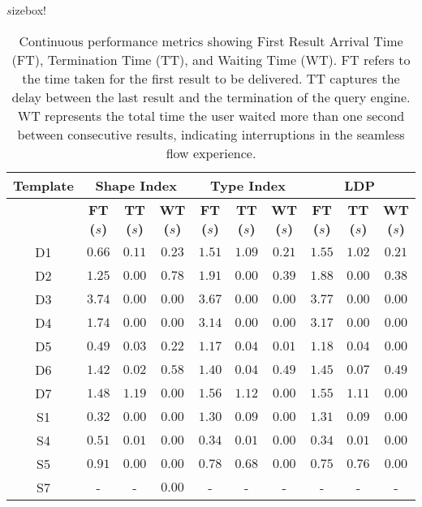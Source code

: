 \renewcommand{\arraystretch}{1.1}
\begin{table}[h]
    \centering
    \re$s$izebox{\textwidth}{!}{
    \begin{tabular}{|c|c|c|c||c|c|c||c|c|c|}
        \hline
        \textbf{Template} 
        & \multicolumn{3}{|c||}{\textbf{Shape Index}} 
        & \multicolumn{3}{c||}{\textbf{Type Index}} 
        & \multicolumn{3}{c|}{\textbf{LDP}} \\
        \hline
        & \textbf{FT ($s$)} & \textbf{TT ($s$)} & \textbf{WT ($s$)} 
        & \textbf{FT ($s$)} & \textbf{TT ($s$)} & \textbf{WT ($s$)} 
        & \textbf{FT ($s$)} & \textbf{TT ($s$)} & \textbf{WT ($s$)} \\
        \hline
        D1 & $\boldsymbol{0.66}$ & $\boldsymbol{0.11}$ & $0.23$ & $1.51$ & $1.09$ & $\boldsymbol{0.21}$ & $1.55$ & $1.02$ & $0.21$ \\
        \hline
        D2 & $\boldsymbol{1.25}$ & $0.00$ & $0.78$ & $1.91$ & $\boldsymbol{0.00}$ & $0.39$ & $1.88$ & $0.00$ & $\boldsymbol{0.38}$ \\
        \hline
        D3 & $3.74$ & $\boldsymbol{0.00}$ & $0.00$ & $\boldsymbol{3.67}$ & $0.00$ & $0.00$ & $3.77$ & $0.00$ & $0.00$ \\
        \hline
        D4 & $\boldsymbol{1.74}$ & $0.00$ & $0.00$ & $3.14$ & $0.00$ & $0.00$ & $3.17$ & $\boldsymbol{0.00}$ & $0.00$ \\
        \hline
        D5 & $\boldsymbol{0.49}$ & $\boldsymbol{0.03}$ & $0.22$ & $1.17$ & $0.04$ & $0.01$ & $1.18$ & $0.04$ & $\boldsymbol{0.00}$ \\
        \hline
        D6 & $1.42$ & $\boldsymbol{0.02}$ & $0.58$ & $\boldsymbol{1.40}$ & $0.04$ & $\boldsymbol{0.49}$ & $1.45$ & $0.07$ & $0.49$ \\
        \hline
        D7 & $\boldsymbol{1.48}$ & $1.19$ & $0.00$ & $1.56$ & $1.12$ & $0.00$ & $1.55$ & $\boldsymbol{1.11}$ & $0.00$ \\
        \hline
        S1 & $\boldsymbol{0.32}$ & $\boldsymbol{0.00}$ & $0.00$ & $1.30$ & $0.09$ & $0.00$ & $1.31$ & $0.09$ & $0.00$ \\
        \hline
        S4 & $0.51$ & $\boldsymbol{0.01}$ & $0.00$ & $\boldsymbol{0.34}$ & $0.01$ & $0.00$ & $0.34$ & $0.01$ & $0.00$ \\
        \hline
        S5 & $0.91$ & $\boldsymbol{0.00}$ & $0.00$ & $0.78$ & $0.68$ & $0.00$ & $\boldsymbol{0.75}$ & $0.76$ & $0.00$ \\
        \hline
        S7 & - & - & $\boldsymbol{0.00}$ & - & - & - & - & - & - \\
        \hline
    \end{tabular}
    }
    \caption{Continuous performance metrics showing First Result Arrival Time (FT), Termination Time (TT), and Waiting Time (WT). FT refers to the time taken for the first result to be delivered.
     TT captures the delay between the last result and the termination of the query engine.
    WT represents the total time the user waited more than one second between consecutive results, indicating interruptions in the seamless flow experience.}
	\label{tab:continuousPerf}
\end{table}
    